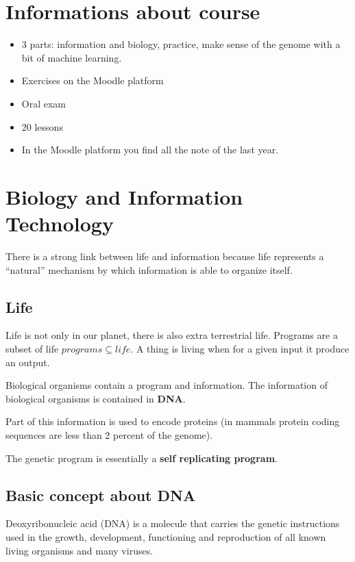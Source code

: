 \section{Informations about course}

\begin{itemize}
  \item 3 parts: information and biology, practice, make sense of the genome
with a bit of machine learning.
  \item Exercises on the Moodle platform
  \item Oral exam
  \item 20 lessons
  \item In the Moodle platform you find all the note of the last year.
\end{itemize}

\section{Biology and Information Technology}

There is a strong link between life and information because life represents a
``natural'' mechanism by which information is able to organize itself.

\subsection{Life}
Life is not only in our planet, there is also extra terrestrial life.
Programs are a subset of life $programs \subseteq life$. A thing is living
when for a given input it produce an output.

Biological organisms contain a program and information. The information of 
biological organisms is contained in \textbf{DNA}.

Part of this information is used to encode proteins (in mammals protein coding 
sequences are less than 2 percent of the genome).

The genetic program is essentially a \textbf{self replicating program}.

\subsection{Basic concept about DNA}

Deoxyribonucleic acid (DNA) is a molecule that carries the genetic instructions used 
in the growth, development, functioning and reproduction of all known living organisms
 and many viruses. 

